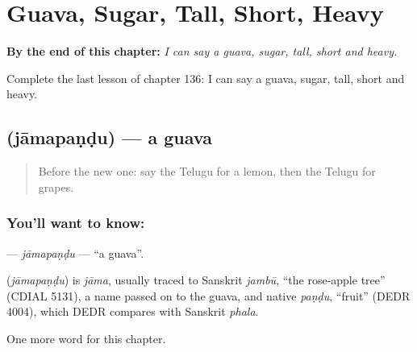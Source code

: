 
\chapter{Guava, Sugar, Tall, Short, Heavy}
\label{ch:te-guava-sugar-tall-short-heavy}

\begin{chapteropening}
\textbf{By the end of this chapter:} \emph{I can say a guava, sugar, tall, short and heavy.}

Complete the last lesson of chapter 136: I can say a guava, sugar, tall, short and heavy.
\end{chapteropening}

\section[\texorpdfstring{\te{జామపండు} (jāmapaṇḍu)}{జామపండు (jāmapaṇḍu)}]{ (jāmapaṇḍu) — a guava}

\label{lesson:TE-C136-jamapandu}



\begin{quote}
Before the new one: say the Telugu for a lemon, then the Telugu for grapes.
\end{quote}

\subsection*{You'll want to know: }
\textbf{} — \emph{jāmapaṇḍu} — \textquotedblleft{}a guava\textquotedblright{}.

\begin{cousinweb}
\textbf{} (\emph{jāmapaṇḍu}) is \emph{jāma}, usually traced to Sanskrit \emph{jambū}, \textquotedblleft{}the rose-apple tree\textquotedblright{} (CDIAL 5131), a name passed on to the guava, and native \emph{paṇḍu}, \textquotedblleft{}fruit\textquotedblright{} (DEDR 4004), which DEDR compares with Sanskrit \emph{phala}.
\end{cousinweb}

\begin{grammarlens}[title={What you've built}]
One more word for this chapter.
\end{grammarlens}

